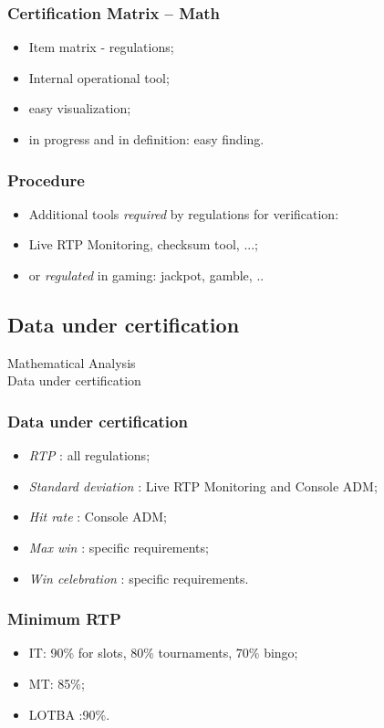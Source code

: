 \documentclass{beamer}
\begin{document}
\begin{frame}
\frametitle{Certification Matrix -- Math}
\begin{itemize}
\item<1-> Item matrix - regulations;
\item<2-> Internal operational tool;
\item<3-> easy visualization;
\item<4-> in progress and in definition: easy finding.
\end{itemize}
\end{frame}

\begin{frame}
\frametitle{Procedure}
\begin{itemize}
\item<1-> Additional tools \emph{required} by regulations for verification:
\item<2-> Live RTP Monitoring, checksum tool, ...;
\item<3-> or \emph{regulated} in gaming: jackpot, gamble, ..
\end{itemize}
\end{frame}

\begin{frame}
\section{Data under certification} %
\centering \Large Mathematical Analysis \\ \large Data under certification
\end{frame}

\begin{frame}
\frametitle{Data under certification}
\begin{itemize}
\item<1-> \emph{RTP} : all regulations;
\item<2-> \emph{Standard deviation} : Live RTP Monitoring and Console ADM;
\item<3-> \emph{Hit rate} : Console ADM;
\item<4-> \emph{Max win} : specific requirements;
\item<5-> \emph{Win celebration} : specific requirements.
\end{itemize}
\end{frame}

\begin{frame}
\frametitle{Minimum RTP}
\begin{itemize}
\item<1-> IT: 90\% for slots, 80\% tournaments, 70\% bingo;
\item<2-> MT: 85\%;
\item<3-> LOTBA :90\%.
\end{itemize}
\end{frame}
\end{document}
